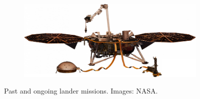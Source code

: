 \begin{figure}[h]
    \begin{subfigure}[t]{\subfigureWidth}
        \centering
		\includegraphics[height=\graphicsHeight]{sections/state-of-the-art/past-and-ongoing-missions/images/lander-insight.png}
		\label{fig:sub:past-mission-lander-insight}
	\end{subfigure}
    \caption[Past and ongoing lander missions]
            {Past and ongoing lander missions. Images: NASA.}
	\label{fig:past-mission-landers}
\vspace{-2ex}
\end{figure}

